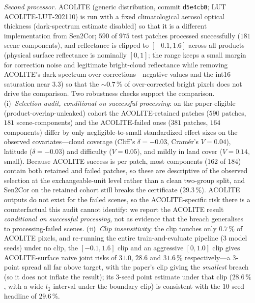 \documentclass[preprint,3p,times]{elsarticle}
\begin{document}
\emph{Second processor.} ACOLITE (generic distribution, commit \texttt{d5e4cb0}; LUT ACOLITE-LUT-202110) is run with a fixed climatological aerosol optical thickness (dark-spectrum estimate disabled) so that it is a different implementation from Sen2Cor; $590$ of $975$ test patches processed successfully ($181$ scene-components), and reflectance is clipped to $[-0.1, 1.6]$ across all products (physical surface reflectance is nominally $[0,1]$; the range keeps a small margin for correction noise and legitimate bright-cloud reflectance while removing ACOLITE's dark-spectrum over-corrections---negative values and the int16 saturation near $3.3$) so that the ${\sim}0.7\,\%$ of over-corrected bright pixels does not drive the comparison. Two robustness checks support the comparison. (i)~\emph{Selection audit, conditional on successful processing}: on the paper-eligible (product-overlap-unleaked) cohort the ACOLITE-retained patches ($590$ patches, $181$ scene-components) and the ACOLITE-failed ones ($381$ patches, $164$ components) differ by only negligible-to-small standardized effect sizes on the observed covariates---cloud coverage (Cliff's $\delta=-0.03$, Cram\'er's $V=0.04$), latitude ($\delta=-0.03$) and difficulty ($V=0.05$), and mildly in land cover ($V=0.14$, small). Because ACOLITE success is per patch, most components ($162$ of $184$) contain both retained and failed patches, so these are descriptive of the observed selection at the exchangeable-unit level rather than a clean two-group split, and Sen2Cor on the retained cohort still breaks the certificate ($29.3\,\%$). ACOLITE outputs do not exist for the failed scenes, so the ACOLITE-specific risk there is a counterfactual this audit cannot identify: we report the ACOLITE result \emph{conditional on successful processing}, not as evidence that the breach generalises to processing-failed scenes. (ii)~\emph{Clip insensitivity}: the clip touches only $0.7\,\%$ of ACOLITE pixels, and re-running the entire train-and-evaluate pipeline ($3$ model seeds) under no clip, the $[-0.1,1.6]$ clip and an aggressive $[0,1.0]$ clip gives ACOLITE-surface naive joint risks of $31.0$, $28.6$ and $31.6\,\%$ respectively---a $3$-point spread all far above target, with the paper's clip giving the \emph{smallest} breach (so it does not inflate the result); its $3$-seed point estimate under that clip ($28.6\,\%$, with a wide $t_2$ interval under the boundary clip) is consistent with the $10$-seed headline of $29.6\,\%$.
\end{document}
